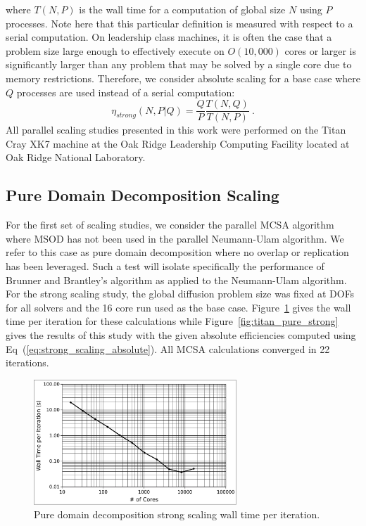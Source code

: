 \documentclass{snamc2013}
\begin{document}
where $T(N,P)$ is the wall time for a computation of global size $N$
using $P$ processes. Note here that this particular definition is
measured with respect to a serial computation. On leadership class
machines, it is often the case that a problem size large enough to
effectively execute on $O(10,000)$ cores or larger is significantly
larger than any problem that may be solved by a single core due to
memory restrictions. Therefore, we consider absolute scaling for a
base case where $Q$ processes are used instead of a serial
computation:
\begin{equation}
  \eta_{strong}(N,P|Q) = \frac{Q}{P} \frac{T(N,Q)}{T(N,P)}\:.
  \label{eq:strong_scaling_absolute_ref}
\end{equation}
All parallel scaling studies presented in this work were performed on
the Titan Cray XK7 machine at the Oak Ridge Leadership Computing
Facility located at Oak Ridge National Laboratory.

\subsection{Pure Domain Decomposition Scaling}
\label{subsec:pure_domain_decomp}
For the first set of scaling studies, we consider the parallel MCSA
algorithm where MSOD has not been used in the parallel Neumann-Ulam
algorithm. We refer to this case as pure domain decomposition where no
overlap or replication has been leveraged. Such a test will isolate
specifically the performance of Brunner and Brantley's algorithm as
applied to the Neumann-Ulam algorithm. For the strong scaling study,
the global diffusion problem size was fixed at  DOFs for
all solvers and the 16 core run used as the base
case. Figure~\ref{fig:titan_pure_strong_time} gives the wall time per
iteration for these calculations while
Figure~\ref{fig:titan_pure_strong} gives the results of this study
with the given absolute efficiencies computed using
Eq~(\ref{eq:strong_scaling_absolute}). All MCSA calculations converged
in 22 iterations.

\begin{figure}[h!]
  \begin{center}
    \includegraphics[width=3in]{titan_pure_strong_time.pdf}
  \end{center}
  \caption{Pure domain decomposition strong scaling wall time per
    iteration.}
  \label{fig:titan_pure_strong_time}
\end{figure}
\end{document}
